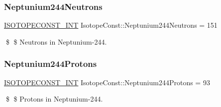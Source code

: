 \subsubsection{\texorpdfstring{Neptunium244\+Neutrons}{Neptunium244Neutrons}}
{\footnotesize\ttfamily \mbox{\hyperlink{group___isotope_const-_macros_ga5f18360b3e99483a35c32d789e62621c}{I\+S\+O\+T\+O\+P\+E\+C\+O\+N\+S\+T\+\_\+\+I\+NT}} Isotope\+Const\+::\+Neptunium244\+Neutrons = 151}

\$ \$ Neutrons in Neptunium-\/244. \mbox{\label{group___isotope_const-_neptunium-_np244_gad0dfb94904f471a2473237795dfbe7ae}} 
\subsubsection{\texorpdfstring{Neptunium244\+Protons}{Neptunium244Protons}}
{\footnotesize\ttfamily \mbox{\hyperlink{group___isotope_const-_macros_ga5f18360b3e99483a35c32d789e62621c}{I\+S\+O\+T\+O\+P\+E\+C\+O\+N\+S\+T\+\_\+\+I\+NT}} Isotope\+Const\+::\+Neptunium244\+Protons = 93}

\$ \$ Protons in Neptunium-\/244. 